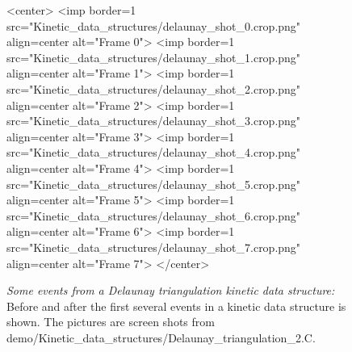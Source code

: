 \begin{figure}[htb]
\begin{ccTexOnly}
\end{ccTexOnly}
\begin{ccHtmlOnly}
<center>
<imp border=1 src="Kinetic_data_structures/delaunay_shot_0.crop.png" align=center alt="Frame 0">
<imp border=1 src="Kinetic_data_structures/delaunay_shot_1.crop.png" align=center alt="Frame 1">
<imp border=1 src="Kinetic_data_structures/delaunay_shot_2.crop.png" align=center alt="Frame 2">
<imp border=1 src="Kinetic_data_structures/delaunay_shot_3.crop.png" align=center alt="Frame 3">
<imp border=1 src="Kinetic_data_structures/delaunay_shot_4.crop.png" align=center alt="Frame 4">
<imp border=1 src="Kinetic_data_structures/delaunay_shot_5.crop.png" align=center alt="Frame 5">
<imp border=1 src="Kinetic_data_structures/delaunay_shot_6.crop.png" align=center alt="Frame 6">
<imp border=1 src="Kinetic_data_structures/delaunay_shot_7.crop.png" align=center alt="Frame 7">
</center>
\end{ccHtmlOnly}
\caption{ \label{fig:delaunay_events} 
{\em Some events from a Delaunay triangulation kinetic data structure:} Before and after the first several events in a kinetic data structure is shown. The pictures are screen shots from demo/Kinetic\_data\_structures/Delaunay\_triangulation\_2.C. }
\end{figure}


\label{fig:delaunay_2_usage_program}
